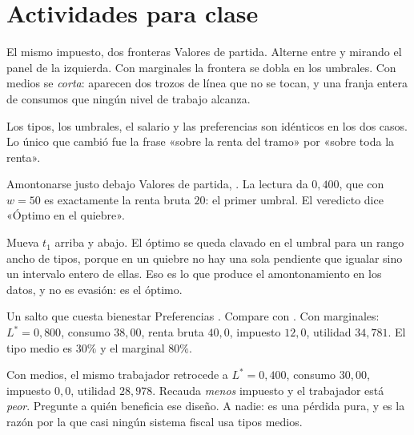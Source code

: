 \documentclass[11pt,a4paper]{appletmanual}
\begin{document}

\section{Actividades para clase}

\begin{activity}{El mismo impuesto, dos fronteras}
\amset Valores de partida. Alterne entre  y
 mirando el panel de la izquierda.
\amexp Con marginales la frontera se dobla en los umbrales. Con medios se
\emph{corta}: aparecen dos trozos de línea que no se tocan, y una franja
entera de consumos que ningún nivel de trabajo alcanza.
\par\smallskip
Los tipos, los umbrales, el salario y las preferencias son idénticos en los dos
casos. Lo único que cambió fue la frase «sobre la renta del tramo» por «sobre
toda la renta».
\end{activity}

\begin{activity}{Amontonarse justo debajo}
\amset Valores de partida, .
\amexp La lectura  da $0{,}400$, que con $w = 50$ es exactamente
la renta bruta $20$: el primer umbral. El veredicto dice
«Óptimo en el quiebre».
\par\smallskip
Mueva $t_1$ arriba y abajo. El óptimo se queda clavado en el umbral para un
rango ancho de tipos, porque en un quiebre no hay una sola pendiente que
igualar sino un intervalo entero de ellas. Eso es lo que produce el
amontonamiento en los datos, y no es evasión: es el óptimo.
\end{activity}

\begin{activity}{Un salto que cuesta bienestar}
\amset Preferencias . Compare  con
.
\amexp Con marginales: $L^\ast = 0{,}800$, consumo $38{,}00$, renta bruta
$40{,}0$, impuesto $12{,}0$, utilidad $34{,}781$. El tipo medio es $30\%$ y el
marginal $80\%$.
\par\smallskip
Con medios, el mismo trabajador retrocede a $L^\ast = 0{,}400$, consumo
$30{,}00$, impuesto $0{,}0$, utilidad $28{,}978$. Recauda \emph{menos} impuesto
y el trabajador está \emph{peor}. Pregunte a quién beneficia ese diseño. A
nadie: es una pérdida pura, y es la razón por la que casi ningún sistema fiscal
usa tipos medios.
\end{activity}
\end{document}
